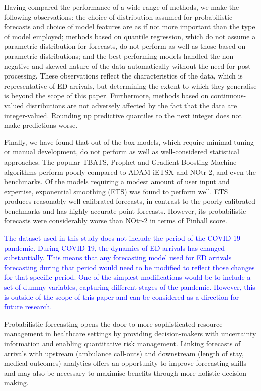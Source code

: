 \documentclass[]{elsarticle} %
\begin{document}
Having compared the performance of a wide range of methods, we make the
following observations: the choice of distribution assumed for
probabilistic forecasts and choice of model features are as if not more
important than the type of model employed; methods based on quantile
regression, which do not assume a parametric distribution for forecasts,
do not perform as well as those based on parametric distributions; and
the best performing models handled the non-negative and skewed nature of
the data automatically without the need for post-processing. These
observations reflect the characteristics of the data, which is
representative of ED arrivals, but determining the extent to which they
generalise is beyond the scope of this paper. Furthermore, methods based
on continuous-valued distributions are not adversely affected by the
fact that the data are integer-valued. Rounding up predictive quantiles
to the next integer does not make predictions worse.

Finally, we have found that out-of-the-box models, which require minimal
tuning or manual development, do not perform as well as well-considered
statistical approaches. The popular TBATS, Prophet and Gradient Boosting
Machine algorithms perform poorly compared to ADAM-iETSX and NOtr-2, and
even the benchmarks. Of the models requiring a modest amount of user
input and expertise, exponential smoothing (ETS) was found to perform
well. ETS produces reasonably well-calibrated forecasts, in contrast to
the poorly calibrated benchmarks and has highly accurate point
forecasts. However, its probabilistic forecasts were considerably worse
than NOtr-2 in terms of Pinball score.

\textcolor{blue}{
The dataset used in this study does not include the period of the COVID-19 pandemic.
During COVID-19, the dynamics of ED arrivals has changed substantially. This means that
any forecasting model used for ED arrivals forecasting during that period would need to be
modified to reflect those changes for that specific period. One of the simplest modifications
would be to include a set of dummy variables, capturing different stages of the pandemic.
However, this is outside of the scope of this paper and can be considered as a direction for
future research.}

Probabilistic forecasting opens the door to more sophisticated resource
management in healthcare settings by providing decision-makers with
uncertainty information and enabling quantitative risk management.
Linking forecasts of arrivals with upstream (ambulance call-outs) and
downstream (length of stay, medical outcomes) analytics offers an
opportunity to improve forecasting skills and may also be necessary to
maximise benefits through more holistic decision-making.
\end{document}
